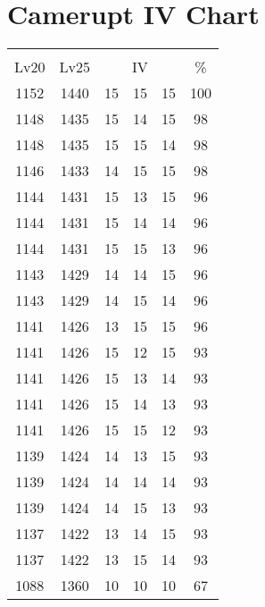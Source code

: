 \documentclass{article}%
\begin{document}
%
\normalsize%
\section{Camerupt IV Chart}%
\label{sec:Camerupt IV Chart}%
\renewcommand{\arraystretch}{1.5}%
\begin{tabular}{|c|c|c|c|c|c|}%
\hline%
\multicolumn{6}{|c|}{\textcolor{white}{ 
\linebreak{Camerupt}
}%
\cellcolor{black}}\\%
\multicolumn{1}{|c}{Lv20}&\multicolumn{1}{c|}{Lv25}&\multicolumn{3}{c|}{IV}&\multicolumn{1}{|c|}{\%}\\%
\hline%
\rowcolor{color100}%
1152&1440&15&15&15&100\\%
\hline%
\rowcolor{color98}%
1148&1435&15&14&15&98\\%
\hline%
\rowcolor{color98}%
1148&1435&15&15&14&98\\%
\hline%
\rowcolor{color98}%
1146&1433&14&15&15&98\\%
\hline%
\rowcolor{color96}%
1144&1431&15&13&15&96\\%
\hline%
\rowcolor{color96}%
1144&1431&15&14&14&96\\%
\hline%
\rowcolor{color96}%
1144&1431&15&15&13&96\\%
\hline%
\rowcolor{color96}%
1143&1429&14&14&15&96\\%
\hline%
\rowcolor{color96}%
1143&1429&14&15&14&96\\%
\hline%
\rowcolor{color96}%
1141&1426&13&15&15&96\\%
\hline%
\rowcolor{color93}%
1141&1426&15&12&15&93\\%
\hline%
\rowcolor{color93}%
1141&1426&15&13&14&93\\%
\hline%
\rowcolor{color93}%
1141&1426&15&14&13&93\\%
\hline%
\rowcolor{color93}%
1141&1426&15&15&12&93\\%
\hline%
\rowcolor{color93}%
1139&1424&14&13&15&93\\%
\hline%
\rowcolor{color93}%
1139&1424&14&14&14&93\\%
\hline%
\rowcolor{color93}%
1139&1424&14&15&13&93\\%
\hline%
\rowcolor{color93}%
1137&1422&13&14&15&93\\%
\hline%
\rowcolor{color93}%
1137&1422&13&15&14&93\\%
\hline%
\rowcolor{color91}%
1088&1360&10&10&10&67\\%
\end{tabular}

%
\end{document}
